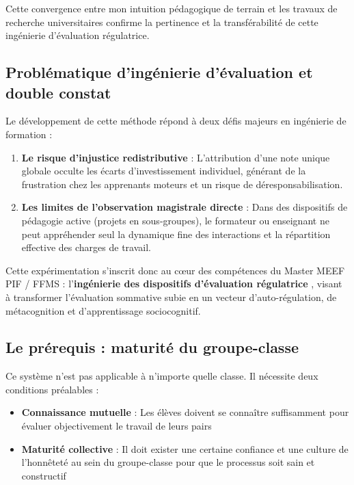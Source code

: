 Cette convergence entre mon intuition pédagogique de terrain et les travaux de recherche universitaires confirme la pertinence et la transférabilité de cette ingénierie d'évaluation régulatrice.

\subsection{Problématique d'ingénierie d'évaluation et double constat}

Le développement de cette méthode répond à deux défis majeurs en ingénierie de formation :
\begin{enumerate}[leftmargin=*]
    \item \textbf{Le risque d'injustice redistributive} : L'attribution d'une note unique globale occulte les écarts d'investissement individuel, générant de la frustration chez les apprenants moteurs et un risque de déresponsabilisation.
    \item \textbf{Les limites de l'observation magistrale directe} : Dans des dispositifs de pédagogie active (projets en sous-groupes), le formateur ou enseignant ne peut appréhender seul la dynamique fine des interactions et la répartition effective des charges de travail.
\end{enumerate}

Cette expérimentation s'inscrit donc au cœur des compétences du Master MEEF PIF / FFMS : l'\textbf{ingénierie des dispositifs d'évaluation régulatrice} \parencite{perrenoud_pratique_reflexive,nicol_formative_assessment}, visant à transformer l'évaluation sommative subie en un vecteur d'auto-régulation, de métacognition et d'apprentissage sociocognitif.

\subsection{Le prérequis : maturité du groupe-classe}

Ce système n'est pas applicable à n'importe quelle classe. Il nécessite deux conditions préalables \parencite{evaluation_pairs_utc} :

\begin{itemize}[leftmargin=*]
    \item \textbf{Connaissance mutuelle} : Les élèves doivent se connaître suffisamment pour évaluer objectivement le travail de leurs pairs
    \item \textbf{Maturité collective} : Il doit exister une certaine confiance et une culture de l'honnêteté au sein du groupe-classe pour que le processus soit sain et constructif
\end{itemize}

